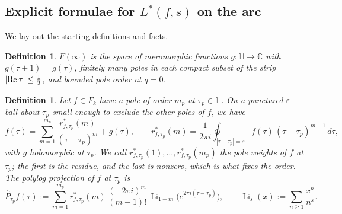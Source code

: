 \documentclass[11pt]{article}
\newtheorem{definition}[theorem]{Definition}
\newcommand{\HH}{\mathbb{H}}
\newcommand{\CC}{\mathbb{C}}
\DeclareMathOperator{\Li}{Li}
\begin{document}
\subsection{Explicit formulae for $L^*(f,s)$ on the arc}\label{sec:arcL}


We lay out the starting definitions and facts.

\begin{definition}\label{def:Finfty_arc}
$F(\infty)$ is the space of meromorphic functions $g:\HH\to\CC$ with $g(\tau+1)=g(\tau)$, finitely
many poles in each compact subset of the strip $|{\rm Re}\,\tau|\le\tfrac12$, and bounded pole
order at $q=0$.
\end{definition}

\begin{definition}\label{def:proj_arc}
Let $f\in F_k$ have a pole of order $m_p$ at $\tau_p\in\HH$. On a punctured $\varepsilon$-ball
about $\tau_p$ small enough to exclude the other poles of $f$, we have
\begin{equation}\label{eq:laurent_arc}
f(\tau)=\sum_{m=1}^{m_p}\frac{r^*_{f,\tau_p}(m)}{(\tau-\tau_p)^{m}}+g(\tau),
\qquad
r^*_{f,\tau_p}(m)=\frac{1}{2\pi i}\oint_{|\tau-\tau_p|=\varepsilon}
f(\tau)\,(\tau-\tau_p)^{m-1}\,d\tau ,
\end{equation}
with $g$ holomorphic at $\tau_p$. We call $r^*_{f,\tau_p}(1),\dots,r^*_{f,\tau_p}(m_p)$ the
\emph{pole weights} of $f$ at $\tau_p$; the first is the residue, and the last is nonzero, which is
what fixes the order. The \emph{polylog projection} of $f$ at $\tau_p$ is
\begin{equation}\label{eq:polyproj_arc}
\widehat P_{\tau_p}f(\tau):=\sum_{m=1}^{m_p} r^*_{f,\tau_p}(m)\,
\frac{(-2\pi i)^m}{(m-1)!}\,\Li_{1-m}\big(e^{2\pi i(\tau-\tau_p)}\big),
\qquad \Li_s(x):=\sum_{n\ge1}\frac{x^{n}}{n^{s}}.
\end{equation}
\end{definition}
\end{document}

